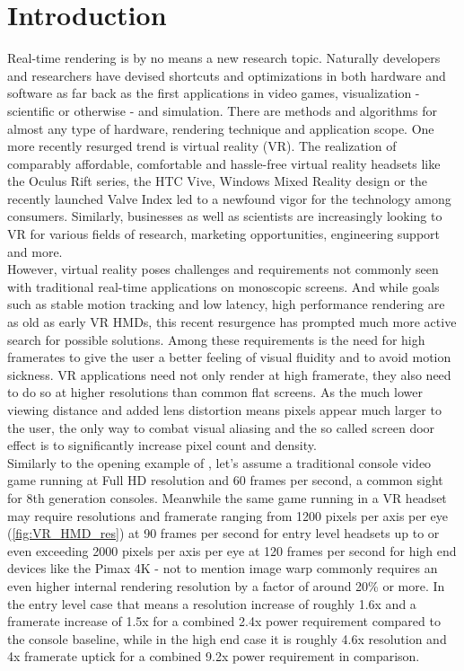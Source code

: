 
\chapter{Introduction}
Real-time rendering is by no means a new research topic. Naturally developers and researchers have devised shortcuts and optimizations in both hardware and software as far back as the first applications in video games, visualization - scientific or otherwise - and simulation. There are methods and algorithms for almost any type of hardware, rendering technique and application scope. 
One more recently resurged trend is virtual reality (VR). The realization of comparably affordable, comfortable and hassle-free virtual reality headsets like the Oculus Rift series, the HTC Vive, Windows Mixed Reality design or the recently launched Valve Index led to a newfound vigor for the technology among consumers. Similarly, businesses as well as scientists are increasingly looking to VR for various fields of research, marketing opportunities, engineering support and more. \\
However, virtual reality poses challenges and requirements not commonly seen with traditional real-time applications on monoscopic screens. And while goals such as stable motion tracking and low latency, high performance rendering are as old as early VR HMDs, this recent resurgence has prompted much more active search for possible solutions. Among these requirements is the need for high framerates to give the user a better feeling of visual fluidity and to avoid motion sickness. VR applications need not only render at high framerate, they also need to do so at higher resolutions than common flat screens. As the much lower viewing distance and added lens distortion means pixels appear much larger to the user, the only way to combat visual aliasing and the so called screen door effect is to significantly increase pixel count and density. \\

Similarly to the opening example of \cite{InigoQuilez.2017}, let's assume a traditional console video game running at Full HD resolution and 60 frames per second, a common sight for 8th generation consoles. Meanwhile the same game running in a VR headset may require resolutions and framerate ranging from 1200 pixels per axis per eye (\autoref{fig:VR_HMD_res}) at 90 frames per second for entry level headsets up to or even exceeding 2000 pixels per axis per eye at 120 frames per second for high end devices like the Pimax 4K - not to mention image warp commonly requires an even higher internal rendering resolution by a factor of around 20\% or more. In the entry level case that means a resolution increase of roughly 1.6x and a framerate increase of 1.5x for a combined 2.4x power requirement compared to the console baseline, while in the high end case it is roughly 4.6x resolution and 4x framerate uptick for a combined 9.2x power requirement in comparison. \\

